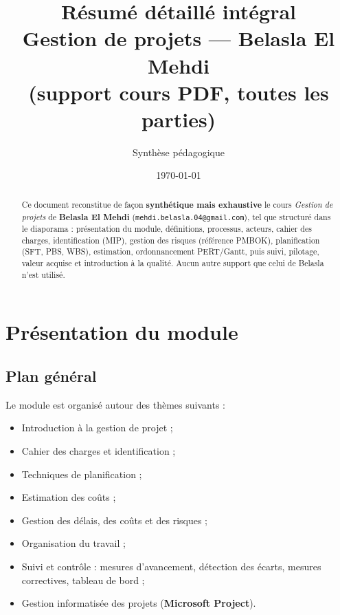 \documentclass[11pt,a4paper]{article}
\title{\textbf{Résumé détaillé intégral}\\[0.2em]\large Gestion de projets — Belasla El Mehdi\\\normalsize(support cours PDF, toutes les parties)}
\author{Synthèse pédagogique}
\date{\today}
\begin{document}
\maketitle

\begin{abstract}
\noindent
Ce document reconstitue de façon \textbf{synthétique mais exhaustive} le cours \emph{Gestion de projets} de \textbf{Belasla El Mehdi} (\texttt{mehdi.belasla.04@gmail.com}), tel que structuré dans le diaporama : présentation du module, définitions, processus, acteurs, cahier des charges, identification (MIP), gestion des risques (référence PMBOK), planification (SFT, PBS, WBS), estimation, ordonnancement PERT/Gantt, puis suivi, pilotage, valeur acquise et introduction à la qualité. Aucun autre support que celui de Belasla n'est utilisé.
\end{abstract}

\tableofcontents
\newpage

\section{Présentation du module}

\subsection{Plan général}
Le module est organisé autour des thèmes suivants :
\begin{itemize}[nosep]
  \item Introduction à la gestion de projet ;
  \item Cahier des charges et identification ;
  \item Techniques de planification ;
  \item Estimation des coûts ;
  \item Gestion des délais, des coûts et des risques ;
  \item Organisation du travail ;
  \item Suivi et contrôle : mesures d'avancement, détection des écarts, mesures correctives, tableau de bord ;
  \item Gestion informatisée des projets (\textbf{Microsoft Project}).
\end{itemize}
\end{document}
